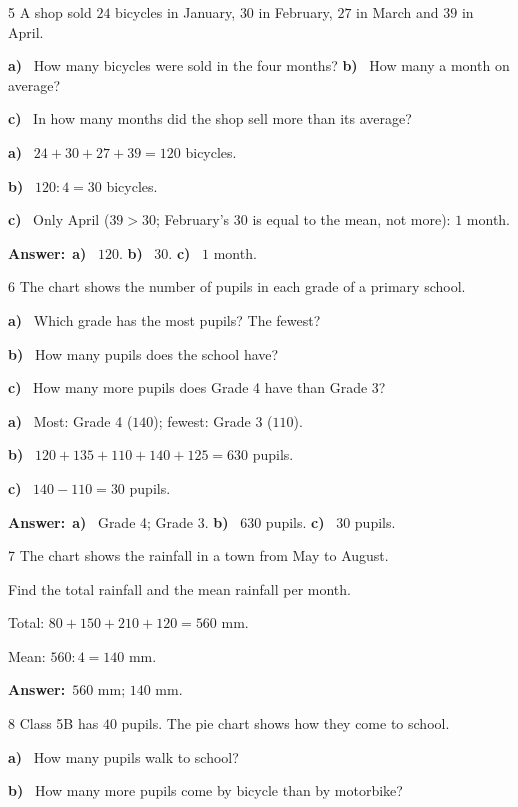 \documentclass[11pt]{article}
\newif\ifsol \solfalse
\providecommand{\AnsWord}{Đáp số}
\newcommand{\dapso}[1]{\par\textbf{\AnsWord:}\ #1}
\newcommand{\probsol}[1]{%
  \begin{lrbox}{\solmeasure}\begin{minipage}{\dimexpr\linewidth-24pt\relax}#1\end{minipage}\end{lrbox}%
  \ifsol
    \begin{solbox}#1\end{solbox}%
  \else
    \setlength{\solht}{\dimexpr\ht\solmeasure+\dp\solmeasure+0.85cm\relax}%
    \ifdim\solht<1.35cm\setlength{\solht}{1.35cm}\fi
    \begin{tcolorbox}[colback=white,colframe=Line,boxrule=0.8pt,arc=5pt,
      left=8pt,right=8pt,top=4pt,bottom=4pt,height=\solht]{\footnotesize\color{Slate}\itshape\WorkWord}\end{tcolorbox}%
  \fi}
\newcommand{\pa}[1]{\textbf{#1)}\ }
\newcommand{\gap}{\vspace{0.3cm}}
\def\WorkWord{Your work:}
\def\AnsWord{Answer}
\begin{document}
\gap
\begin{probbox}{5}{\relax}
A shop sold $24$ bicycles in January, $30$ in February, $27$ in March and $39$ in April.\par
\pa{a} How many bicycles were sold in the four months? \quad \pa{b} How many a month on average?\par
\pa{c} In how many months did the shop sell more than its average?
\end{probbox}
\probsol{
\pa{a} $24+30+27+39=120$ bicycles.\par
\pa{b} $120:4=30$ bicycles.\par
\pa{c} Only April ($39>30$; February's $30$ is equal to the mean, not more): $1$ month.
\dapso{\pa{a} $120$. \pa{b} $30$. \pa{c} $1$ month.}}
\gap
\needspace{8.5cm}
\begin{probbox}{6}{\relax}
The chart shows the number of pupils in each grade of a primary school.
\begin{center}
\end{center}
\pa{a} Which grade has the most pupils? The fewest?\par
\pa{b} How many pupils does the school have?\par
\pa{c} How many more pupils does Grade 4 have than Grade 3?
\end{probbox}
\probsol{
\pa{a} Most: Grade 4 ($140$); fewest: Grade 3 ($110$).\par
\pa{b} $120+135+110+140+125=630$ pupils.\par
\pa{c} $140-110=30$ pupils.
\dapso{\pa{a} Grade 4; Grade 3. \pa{b} $630$ pupils. \pa{c} $30$ pupils.}}
\gap
\needspace{8.5cm}
\begin{probbox}{7}{\relax}
The chart shows the rainfall in a town from May to August.
\begin{center}
\end{center}
Find the total rainfall and the mean rainfall per month.
\end{probbox}
\probsol{
Total: $80+150+210+120=560$ mm.\par Mean: $560:4=140$ mm.
\dapso{$560$ mm; $140$ mm.}}
\gap
\needspace{7.5cm}
\begin{probbox}{8}{\relax}
Class 5B has $40$ pupils. The pie chart shows how they come to school.
\begin{center}
\end{center}
\pa{a} How many pupils walk to school?\par
\pa{b} How many more pupils come by bicycle than by motorbike?
\end{probbox}
\end{document}
